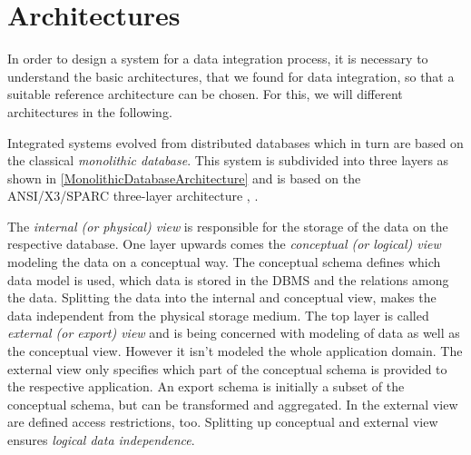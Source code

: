\section{Architectures}

In order to design a system for a data integration process, it is necessary to understand the basic architectures, that we found for data integration, so that a suitable reference architecture can be chosen. For this, we will different architectures in the following.


Integrated systems evolved from distributed databases which in turn are based on the classical \emph{monolithic database}. 
This system is subdivided into three layers as shown in \ref{MonolithicDatabaseArchitecture} and is based on the ANSI/X3/SPARC three-layer architecture \cite{TSICHRITZIS1978173}, \cite[p. 84/85]{DBLP:books/dp/LeserN2006}.

The \textit{internal (or physical) view} is responsible for the storage of the data on the respective database. 
One layer upwards comes the \textit{conceptual (or logical) view} modeling the data on a conceptual way. The conceptual schema defines which data model is used, which data is stored in the DBMS and the relations among the data.
Splitting the data into the internal and conceptual view, makes the data independent from the physical storage medium. The top layer is called \textit{external (or export) view} and is being concerned with modeling of data as well as the conceptual view. However it isn't modeled the whole application domain. The external view only specifies which part of the conceptual schema is provided to the respective application. An export schema is initially a subset of the conceptual schema, but can be transformed and aggregated. In the external view are defined access restrictions, too. Splitting up conceptual and external view ensures \textit{logical data independence}.

